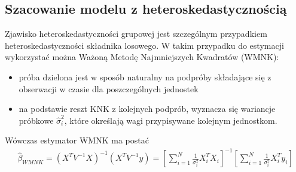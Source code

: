 \subsection{Szacowanie modelu z heteroskedastycznością}
Zjawisko heteroskedastyczności grupowej jest szczególnym przypadkiem heteroskedastyczności składnika losowego. W takim przypadku do estymacji wykorzystać można Ważoną Metodę Najmniejszych Kwadratów (WMNK):
\begin{itemize}
\item próba dzielona jest w sposób naturalny na podpróby składające się z obserwacji w czasie dla poszczególnych jednostek
\item na podstawie reszt KNK z kolejnych podprób, wyznacza się wariancje próbkowe $ \hat \sigma_i^2 $, które określają wagi przypisywane kolejnym jednostkom.
\end{itemize}
Wówczas estymator WMNK ma postać
\begin{gather*}
\hat \beta_{WMNK}=
\left(X^TV^{-1}X\right)^{-1}
\left(X^TV^{-1}y\right)=
\left[\sum_{i=1}^{N}\frac{1}{\sigma_i^2}X_i^TX_i\right]^{-1}
\left[\sum_{i=1}^{N}\frac{1}{\sigma_i^2}X_i^Ty_i\right]
\end{gather*}
